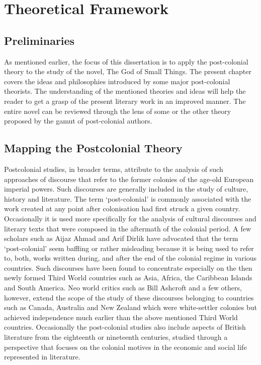 \chapter{Theoretical Framework}

\section{Preliminaries}

As mentioned earlier, the focus of this dissertation is to apply the post-colonial theory to the study of the novel, The God of Small Things. The present chapter covers the ideas and philosophies introduced by some major post-colonial theorists. The understanding of the mentioned theories and ideas will help the reader to get a grasp of the present literary work in an improved manner. The entire novel can be reviewed through the lens of some or the other theory proposed by the gamut of post-colonial authors.

\section{Mapping the Postcolonial Theory}

Postcolonial studies, in broader terms, attribute to the analysis of such approaches of discourse that refer to the former colonies of the age-old European imperial powers. Such discourses are generally included in the study of culture, history and literature. The term ‘post-colonial’ is commonly associated with the work created at any point after colonisation had first struck a given country. Occasionally it is used more specifically for the analysis of cultural discourses and literary texts that were composed in the aftermath of the colonial period. A few scholars such as Aijaz Ahmad and Arif Dirlik have advocated that the term ‘post-colonial’ seem baffling or rather misleading because it is being used to refer to, both, works written during, and after the end of the colonial regime in various countries. Such discourses have been found to concentrate especially on the then newly formed Third World countries such as Asia, Africa, the Caribbean Islands and South America. Neo world critics such as Bill Ashcroft and a few others, however, extend the scope of the study of these discourses belonging to countries such as Canada, Australia and New Zealand which were white-settler colonies but achieved independence much earlier than the above mentioned Third World countries. Occasionally the post-colonial studies also include aspects of British literature from the eighteenth or nineteenth centuries, studied through a perspective that focuses on the colonial motives in the economic and social life represented in literature. 

